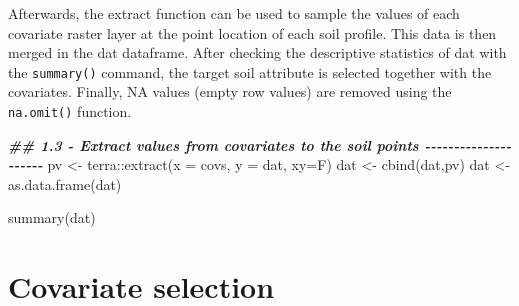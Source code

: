 \documentclass[
  10pt,
  b5paper,
  oneside]{book}
\newenvironment{Shaded}{\begin{snugshade}}{\end{snugshade}}
\newcommand{\AttributeTok}[1]{\textcolor[rgb]{0.77,0.63,0.00}{#1}}
\newcommand{\DocumentationTok}[1]{\textcolor[rgb]{0.56,0.35,0.01}{\textbf{\textit{#1}}}}
\newcommand{\FunctionTok}[1]{\textcolor[rgb]{0.00,0.00,0.00}{#1}}
\newcommand{\NormalTok}[1]{#1}
\newcommand{\OtherTok}[1]{\textcolor[rgb]{0.56,0.35,0.01}{#1}}
\newcommand{\SpecialCharTok}[1]{\textcolor[rgb]{0.00,0.00,0.00}{#1}}
\begin{document}
Afterwards, the extract function can be used to sample the values of each covariate raster layer at the point location of each soil profile. This data is then merged in the dat dataframe. After checking the descriptive statistics of dat with the \texttt{summary()} command, the target soil attribute is selected together with the covariates. Finally, NA values (empty row values) are removed using the \texttt{na.omit()} function.

\begin{Shaded}
\begin{Highlighting}[]
\DocumentationTok{\#\# 1.3 {-} Extract values from covariates to the soil points {-}{-}{-}{-}{-}{-}{-}{-}{-}{-}{-}{-}{-}{-}{-}{-}{-}{-}{-}{-}{-}}
\NormalTok{pv }\OtherTok{\textless{}{-}}\NormalTok{ terra}\SpecialCharTok{::}\FunctionTok{extract}\NormalTok{(}\AttributeTok{x =}\NormalTok{ covs, }\AttributeTok{y =}\NormalTok{ dat, }\AttributeTok{xy=}\NormalTok{F)}
\NormalTok{dat }\OtherTok{\textless{}{-}} \FunctionTok{cbind}\NormalTok{(dat,pv)}
\NormalTok{dat }\OtherTok{\textless{}{-}} \FunctionTok{as.data.frame}\NormalTok{(dat)}

\FunctionTok{summary}\NormalTok{(dat)}
\end{Highlighting}
\end{Shaded}

\hypertarget{covariate-selection}{%
\section{Covariate selection}\label{covariate-selection}}
\end{document}
